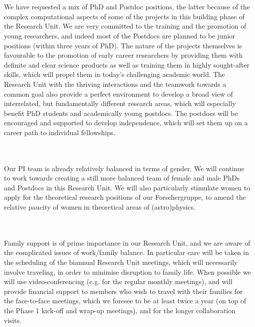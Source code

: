 \documentclass[12pt]{article}
\begin{document}
\mbox{}\vspace{1em}\\
\\
%
\noindent We have requested a mix of PhD and Postdoc positions, the
latter because of the complex computational aspects of some of the
projects in this building phase of the Research Unit. We are very
committed to the training and the promotion of young researchers, and
indeed most of the Postdocs are planned to be junior positions (within
three years of PhD). The nature of the projects themselves is
favourable to the promotion of early career researchers by providing
them with definite and clear science products as well as training them
in highly sought-after skills, which will propel them in today's
challenging academic world. The Research Unit with the thriving
interactions and the teamwork towards a common goal also provide a
perfect environment to develop a broad view of interrelated, but
fundamentally different research areas, which will especially benefit
PhD students and academically young postdocs. The postdocs will be
encouraged and supported to develop independence, which will set them
up on a career path to individual fellowships. 

\mbox{}\vspace{1em}\\
\\
Our PI team is already relatively balanced in terms of gender. We will
continue to work towards creating a still
more balanced team of female and male PhDs and Postdocs in this
Research Unit. We will also particularly stimulate women to apply for the theoretical research positions of our Forschergruppe, to amend the relative paucity of women in theoretical areas of (astro)physics.

\mbox{}\vspace{1em}\\
\\
Family support is of prime importance in our Research Unit, and we are
aware of the complicated issues of work/family balance. In particular
care will be taken in the scheduling of the biannual Research Unit
meetings, which will necessarily involve traveling, in order to
minimise disruption to family life. When possible we will use
video-conferencing (e.g. for the regular monthly meetings), and will
provide financial support to members who wish to travel with their
families for the face-to-face meetings, which we foresee to be at
least twice a year (on top of the Phase 1 kick-off and wrap-up
meetings), and for the longer collaboration visits. 
\end{document}
